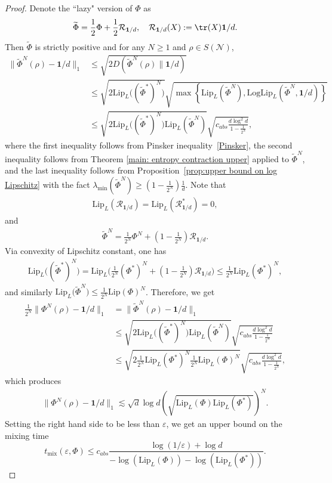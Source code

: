 \documentclass[11pt,reqno]{amsart}
\numberwithin{equation}{section}
\newcommand{\wt}{\widetilde}
\newcommand{\mc}{\mathcal}
\newcommand{\Lip}{\mathrm{Lip}}
\begin{document}
\begin{proof}
    Denote the ``lazy" version of $\Phi$ as 
    \begin{align*}
        \wt \Phi = \frac{1}{2}\Phi + \frac{1}{2} \mc R_{\textbf{1}/d},\quad \mc R_{\textbf{1}/d}(X):= \tr(X) \textbf{1}/d. 
    \end{align*}
    Then $\wt \Phi$ is strictly positive and for any $N \ge 1$ and $\rho \in S(\mc N)$, 
    \begin{align*}
        \|\wt \Phi^N(\rho) - \textbf{1}/d\|_1 & \le \sqrt{2 D(\wt \Phi^N(\rho)\|\textbf{1}/d)} \\
        & \le \sqrt{2 \Lip_L\big((\wt \Phi^*)^N\big)} \sqrt{\max\left\{\Lip_L(\wt \Phi^N), \mathrm{Log}\Lip_L(\wt \Phi^N,\textbf{1}/d) \right\}} \\
        & \le \sqrt{2 \Lip_L\big((\wt \Phi^*)^N\big)\Lip_L(\wt \Phi^N)} \sqrt{c_{abs} \frac{d\log^2 d}{1-\frac{1}{2^N}}},
    \end{align*}
    where the first inequality follows from Pinsker inequality~\eqref{Pinsker}, the second inequality follows from Theorem \ref{main: entropy contraction upper} applied to $\wt \Phi^N$, and the last inequality follows from Proposition~\ref{prop:upper bound on log Lipschitz} with the fact $\lambda_{\min}(\wt \Phi^N) \ge (1-\frac{1}{2^N}) \frac{1}{d}$. Note that 
    \begin{align*}
        \Lip_L(\mc R_{\textbf{1}/d}) = \Lip_L(\mc R^*_{\textbf{1}/d}) = 0,
    \end{align*}
    and \begin{align*}
        \wt \Phi^N = \frac{1}{2^N}\Phi^N + (1- \frac{1}{2^N})\mc R_{\textbf{1}/d}. 
    \end{align*}
    Via convexity of Lipschitz constant, one has 
    \begin{align*}
        \Lip_L\big((\wt \Phi^*)^N\big)= \Lip_L\big(\frac{1}{2^N}(\Phi^*)^N + (1- \frac{1}{2^N})\mc R_{\textbf{1}/d} \big) \le \frac{1}{2^N}\Lip_L(\Phi^*)^N, 
    \end{align*}
    and similarly $\Lip_L\big(\wt \Phi^N\big) \le \frac{1}{2^N}\Lip(\Phi)^N$. Therefore, we get
    \begin{align*}
        \frac{1}{2^N}\|\Phi^N(\rho) - \textbf{1}/d\|_1 & = \|\wt \Phi^N(\rho) - \textbf{1}/d\|_1 \\
        & \le \sqrt{2 \Lip_L\big((\wt \Phi^*)^N\big)\Lip_L(\wt \Phi^N)} \sqrt{c_{abs} \frac{d\log^2 d}{1-\frac{1}{2^N}}} \\
        & \le \sqrt{2 \frac{1}{2^N}\Lip_L(\Phi^*)^N\frac{1}{2^N}\Lip_L(\Phi)^N} \sqrt{c_{abs} \frac{d\log^2 d}{1-\frac{1}{2^N}}},
    \end{align*}
    which produces 
    \begin{align*}
        \|\Phi^N(\rho) - \textbf{1}/d\|_1 \lesssim \sqrt{d}\log d \left(\sqrt{\Lip_L(\Phi) \Lip_L(\Phi^*)}\right)^N.
    \end{align*}
    Setting the right hand side to be less than $\varepsilon$, we get an upper bound on the mixing time
    \begin{equation}
         t_{\mathrm{mix}}(\varepsilon,\Phi) \le c_{abs} \frac{\log(1/\varepsilon)+\log d }{-\log (\Lip_L(\Phi)) - \log( \Lip_L(\Phi^*))}.
    \end{equation}
\end{proof}
\end{document}
